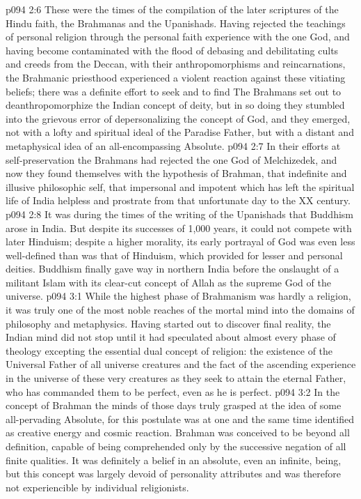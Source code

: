 \vs p094 2:6 \pc These were the times of the compilation of the later scriptures of the Hindu faith, the Brahmanas and the Upanishads. Having rejected the teachings of personal religion through the personal faith experience with the one God, and having become contaminated with the flood of debasing and debilitating cults and creeds from the Deccan, with their anthropomorphisms and reincarnations, the Brahmanic priesthood experienced a violent reaction against these vitiating beliefs; there was a definite effort to seek and to find  The Brahmans set out to deanthropomorphize the Indian concept of deity, but in so doing they stumbled into the grievous error of depersonalizing the concept of God, and they emerged, not with a lofty and spiritual ideal of the Paradise Father, but with a distant and metaphysical idea of an all\hyp{}encompassing Absolute.
\vs p094 2:7 In their efforts at self\hyp{}preservation the Brahmans had rejected the one God of Melchizedek, and now they found themselves with the hypothesis of Brahman, that indefinite and illusive philosophic self, that impersonal and impotent  which has left the spiritual life of India helpless and prostrate from that unfortunate day to the XX century.
\vs p094 2:8 \pc It was during the times of the writing of the Upanishads that Buddhism arose in India. But despite its successes of 1,000 years, it could not compete with later Hinduism; despite a higher morality, its early portrayal of God was even less well\hyp{}defined than was that of Hinduism, which provided for lesser and personal deities. Buddhism finally gave way in northern India before the onslaught of a militant Islam with its clear\hyp{}cut concept of Allah as the supreme God of the universe.
\vs p094 3:1 While the highest phase of Brahmanism was hardly a religion, it was truly one of the most noble reaches of the mortal mind into the domains of philosophy and metaphysics. Having started out to discover final reality, the Indian mind did not stop until it had speculated about almost every phase of theology excepting the essential dual concept of religion: the existence of the Universal Father of all universe creatures and the fact of the ascending experience in the universe of these very creatures as they seek to attain the eternal Father, who has commanded them to be perfect, even as he is perfect.
\vs p094 3:2 In the concept of Brahman the minds of those days truly grasped at the idea of some all\hyp{}pervading Absolute, for this postulate was at one and the same time identified as creative energy and cosmic reaction. Brahman was conceived to be beyond all definition, capable of being comprehended only by the successive negation of all finite qualities. It was definitely a belief in an absolute, even an infinite, being, but this concept was largely devoid of personality attributes and was therefore not experiencible by individual religionists.
